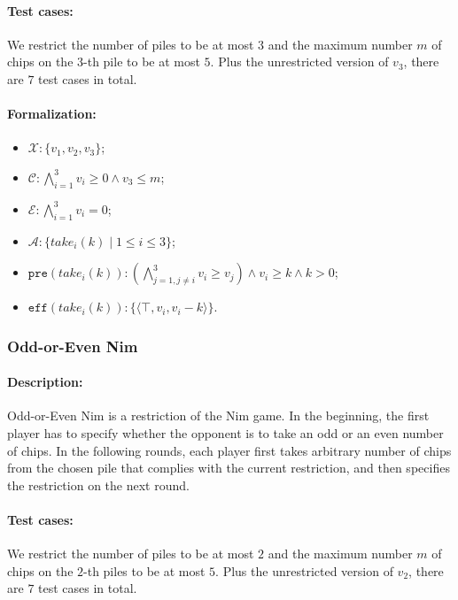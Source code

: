\documentclass[review]{elsarticle}
\newcommand{\set}[1]{\{ #1 \}}
\newcommand{\tuple}[1]{\langle {#1} \rangle}
\newcommand{\true}{\top}
\newcommand{\statevar}{\mathcal{X}}
\newcommand{\act}{\mathcal{A}}
\newcommand{\constraint}{\mathcal{C}}
\newcommand{\estate}{\mathcal{E}}
\newcommand{\pre}{\mathtt{pre}}
\newcommand{\eff}{\mathtt{eff}}
\begin{document}
\paragraph{Test cases:}
We restrict the number of piles to be at most $3$ and the maximum number $m$ of chips on the $3$-th pile to be at most $5$. 
Plus the unrestricted version of $v_3$, there are $7$ test cases in total.

\paragraph{Formalization:}
\begin{itemize}
	\item $\statevar: \set{v_1, v_2, v_3}$;
	\item $\constraint:\bigwedge_{i=1}^{3} v_i \ge 0 \wedge v_3 \le m$;
	\item $\estate: \bigwedge_{i=1}^{3} v_i = 0$;
	\item $\act:\set{take_i(k) {\mid}1\le i \le 3}$;
	\item $\pre(take_i(k)) : (\bigwedge_{j=1,j\neq i}^{3} v_i \ge v_j) \wedge v_i \ge k \wedge  k > 0$;
	\item $\eff(take_i(k)) : \set{\tuple{\true, v_i, v_i-k}}$.
\end{itemize}

\subsubsection{Odd-or-Even Nim \protect\cite{SmiS2002}}

\paragraph{Description:} 
Odd-or-Even Nim is a restriction of the Nim game.
In the beginning, the first player has to specify whether the opponent is to take an odd or an even number of chips. 
In the following rounds, each player first takes arbitrary number of chips from the chosen pile that complies with the current restriction, and then specifies the restriction on the next round.

\paragraph{Test cases:}
We restrict the number of piles to be at most $2$ and the maximum number $m$ of chips on the $2$-th piles to be at most $5$. 
Plus the unrestricted version of $v_2$, there are $7$ test cases in total.
\end{document}
